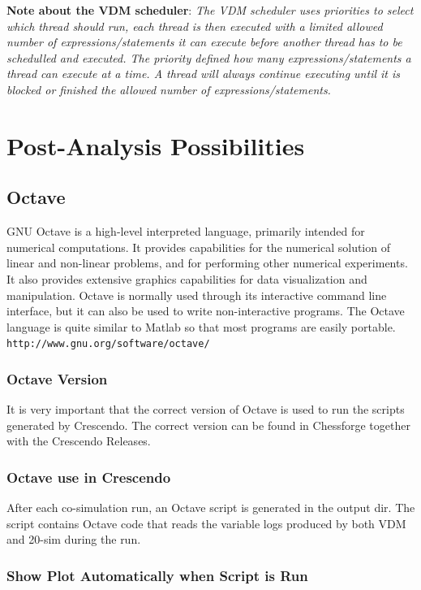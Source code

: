 \documentclass{crescendorepchap}
\newcommand{\url}[1]{\texttt{#1}}
\begin{document}
\textbf{Note about the VDM scheduler}: \emph{The VDM scheduler uses
priorities to select which thread should run, each thread is then
executed with a limited allowed number of expressions/statements it can
execute before another thread has to be schedulled and executed. The
priority defined how many expressions/statements a thread can execute
at a time. A thread will always continue executing until it is blocked
or finished the allowed number of expressions/statements.}

\chapter{Post-Analysis Possibilities}\label{chap:postana}

\section{Octave}\label{sec:octave}

GNU Octave is a high-level interpreted language, primarily intended for
numerical computations. It provides capabilities for the numerical
solution of linear and non-linear problems, and for performing other
numerical experiments. It also provides extensive graphics capabilities
for data visualization and manipulation. Octave is normally used through
its interactive command line interface, but it can also be used to write
non-interactive programs. The Octave language is quite similar to Matlab
so that most programs are easily portable.
\url{http://www.gnu.org/software/octave/}

\subsection{Octave Version}

It is very important that the correct version of Octave is used to run
the scripts generated by Crescendo. The correct version can be found in
Chessforge together with the Crescendo Releases.

\subsection{Octave use in Crescendo}

After each co-simulation run, an Octave script is generated in the
output dir. The script contains Octave code that reads the variable logs
produced by both VDM and 20-sim during the run.

\subsection{Show Plot Automatically when Script is Run}
\end{document}
